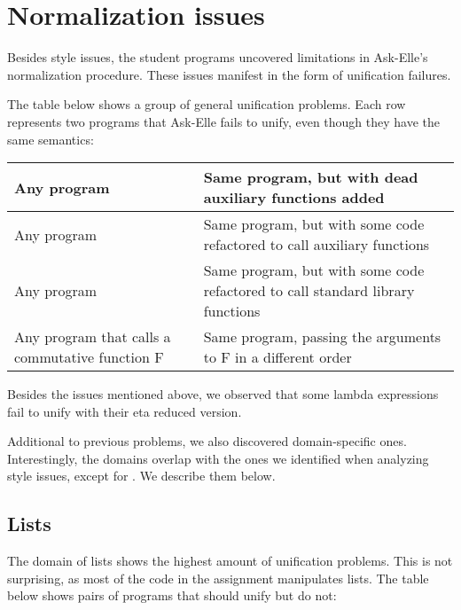 \section{Normalization issues}

Besides style issues, the student programs uncovered limitations in Ask-Elle's normalization procedure. These issues manifest in the form of unification failures.

The table below shows a group of general unification problems. Each row represents two programs that Ask-Elle fails to unify, even though they have the same semantics:

\begin{center}
\begin{tabular}{ m{13em} | m{13em} }
Any program & Same program, but with dead auxiliary functions added \\
\hline
Any program & Same program, but with some code refactored to call auxiliary functions \\
\hline
Any program & Same program, but with some code refactored to call standard library functions \\
\hline
Any program that calls a commutative function F & Same program, passing the arguments to F in a different order
\end{tabular}
\end{center}

Besides the issues mentioned above, we observed that some lambda expressions fail to unify with their eta reduced version.


Additional to previous problems, we also discovered domain-specific ones. Interestingly, the domains overlap with the ones we identified when analyzing style issues, except for . We describe them below.

\subsection{Lists}

The domain of lists shows the highest amount of unification problems. This is not surprising, as most of the code in the assignment manipulates lists. The table below shows pairs of programs that should unify but do not:

